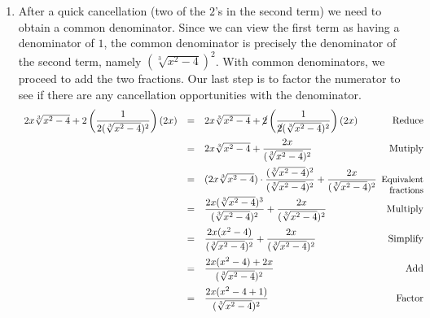 \documentclass{ximera}
\begin{document}
{\begin{example}
\begin{enumerate}
\[\begin{array}{rclr}
\end{array}\]  Without more information about $r$, we cannot simplify $|r|$ any further.  However, we can simplify $|L^2|$.  Regardless of the choice of $L$, $L^2 \geq 0$. Actually, $L^2 > 0$ because $L$ is in the denominator which means $L \neq 0$. Hence, $|L^2| = L^2$.  Our answer simplifies to: \[ \dfrac{\sqrt[4]{\pi}|r|}{|L^2|} = \dfrac{|r|\sqrt[4]{\pi}}{L^2} \]

\item After a quick cancellation (two of the $2$'s in the second term) we need to obtain a common denominator.  Since we can view the first term as having a denominator of $1$,  the common denominator is precisely the denominator of the second term, namely $(\sqrt[3]{x^2-4})^2$.  With common denominators, we proceed to add the two fractions.  Our last step is to factor the numerator to see if there are any cancellation opportunities with the denominator.\[ \begin{array}{rclr}

2x \sqrt[3]{x^2-4} + 2\left(\dfrac{1}{2(\sqrt[3]{x^2-4})^2}\right)  (2x) & = & 2x \sqrt[3]{x^2-4} + \cancel{2}\left(\dfrac{1}{\cancel{2}(\sqrt[3]{x^2-4})^2}\right)  (2x) & \text{Reduce}\\ [12pt]

& = & 2x \sqrt[3]{x^2-4} + \dfrac{2x}{(\sqrt[3]{x^2-4})^2} & \text{Mutiply} \\[12pt]

& = & (2x \sqrt[3]{x^2-4}) \cdot \dfrac{(\sqrt[3]{x^2-4})^2}{(\sqrt[3]{x^2-4})^2} + \dfrac{2x}{(\sqrt[3]{x^2-4})^2} & \hspace*{-.1in}\text{\small Equivalent} \\ [-8pt]
&   &                                                                                                               & \text{\small fractions} \\

& = & \dfrac{2x(\sqrt[3]{x^2-4})^3}{(\sqrt[3]{x^2-4})^2} + \dfrac{2x}{(\sqrt[3]{x^2-4})^2} & \text{Multiply}\\[12pt]

& = & \dfrac{2x(x^2-4)}{(\sqrt[3]{x^2-4})^2} + \dfrac{2x}{(\sqrt[3]{x^2-4})^2} & \text{Simplify}\\ [12pt]

& = & \dfrac{2x(x^2-4) + 2x}{(\sqrt[3]{x^2-4})^2} & \text{Add} \\ [12pt]


& = & \dfrac{2x(x^2-4 +1)}{(\sqrt[3]{x^2-4})^2} & \text{Factor}\\ [12pt]



\end{array}\]
\end{enumerate}
\end{example}}
\end{document}
